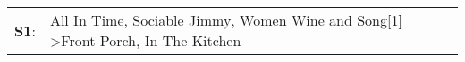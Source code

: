 \begin{supertabular}{p{0.03\textwidth}p{0.92\textwidth}}
 \textbf{S1}:  &  All In Time\textsuperscript{}, \enspace Sociable Jimmy\textsuperscript{}, \enspace Women Wine and Song[1]\textsuperscript{} \textgreater \enspace Front Porch\textsuperscript{}, \enspace In The Kitchen\textsuperscript{}  \enspace  \\
\end{supertabular}
